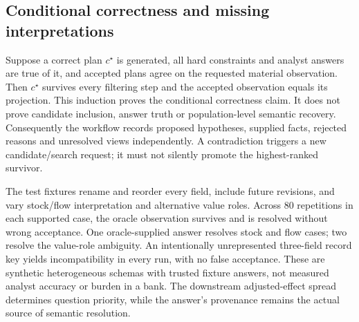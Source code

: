 \subsection{Conditional correctness and missing interpretations}
Suppose a correct plan $c^\star$ is generated, all hard constraints and
analyst answers are true of it, and accepted plans agree on the requested
material observation. Then $c^\star$ survives every filtering step and the
accepted observation equals its projection. This induction proves the
conditional correctness claim. It does not prove candidate inclusion,
answer truth or population-level semantic recovery. Consequently the workflow
records proposed hypotheses, supplied facts, rejected reasons and unresolved
views independently. A contradiction triggers a new candidate/search request;
it must not silently promote the highest-ranked survivor.

The test fixtures rename and reorder every field, include future revisions,
and vary stock/flow interpretation and alternative value roles. Across 80
repetitions in each supported case, the oracle observation survives and is
resolved without wrong acceptance. One oracle-supplied answer resolves stock
and flow cases; two resolve the value-role ambiguity. An intentionally
unrepresented three-field record key yields incompatibility in every run,
with no false acceptance. These are synthetic heterogeneous schemas with
trusted fixture answers, not measured analyst accuracy or burden in a bank.
The downstream adjusted-effect spread determines question priority, while
the answer's provenance remains the actual source of semantic resolution.

